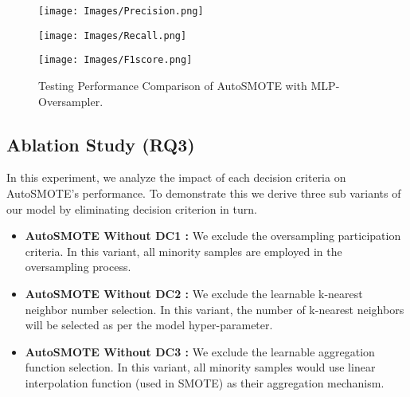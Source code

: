 \begin{figure}[H]
    \centering
    \begin{minipage}[b]{0.48\textwidth} %
        \centering
        \texttt{[image: Images/Precision.png]}
    \end{minipage}
    \hfill
    \begin{minipage}[b]{0.48\textwidth} %
        \centering
        \texttt{[image: Images/Recall.png]}
    \end{minipage}
    
    \vskip 10pt %
    
    \begin{minipage}[b]{0.6\textwidth} %
        \centering
        \texttt{[image: Images/F1score.png]}
    \end{minipage}
    
    \caption{Testing Performance Comparison of AutoSMOTE with MLP-Oversampler.}
    \label{fig:test_performance}
\end{figure}






\subsection{Ablation Study (RQ3)}

In this experiment, we analyze the impact of each decision criteria on AutoSMOTE's performance. To demonstrate this we derive three sub variants of our model by eliminating decision criterion in turn.
\begin{itemize}
  \item \textbf{AutoSMOTE Without DC1 : } We exclude the oversampling participation criteria. In this variant, all minority samples are employed in the oversampling process.
  \item  \textbf{AutoSMOTE Without DC2 : } We exclude the learnable k-nearest neighbor number selection. In this variant, the number of k-nearest neighbors will be selected as per the model hyper-parameter. 
  \item  \textbf{AutoSMOTE Without DC3 : } We exclude the learnable aggregation function selection. In this variant, all minority samples would use linear interpolation function (used in SMOTE) as their aggregation mechanism.
\end{itemize}


